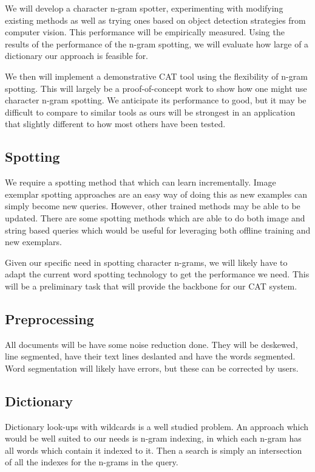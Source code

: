 \documentclass[ms]{byuprop}
\begin{document}
We will develop a character n-gram spotter, experimenting with modifying existing methods as well as trying ones based on object detection strategies from computer vision. This performance will be empirically measured. Using the results of the performance of the n-gram spotting, we will evaluate how large of a dictionary our approach is feasible for.

We then will implement a demonstrative CAT tool using the flexibility of n-gram spotting. This will largely be a proof-of-concept work to show how one might use character n-gram spotting. We anticipate its performance to good, but it may be difficult to compare to similar tools as ours will be strongest in an application that slightly different to how most others have been tested.


\subsection{Spotting}
We require a spotting method that which can learn incrementally. Image exemplar spotting approaches are an easy way of doing this as new examples can simply become new queries. However, other trained methods may be able to be updated. There are some spotting methods which are able to do both image and string based queries\cite{Almazan2014} which would be useful for leveraging both offline training and new exemplars.

Given our specific need in spotting character n-grams, we will likely have to adapt the current word spotting technology to get the performance we need. This will be a preliminary task that will provide the backbone for our CAT system.

\subsection{Preprocessing}
All documents will be have some noise reduction done. They will be deskewed, line segmented, have their text lines deslanted and have the words segmented. Word segmentation will likely have errors, but these can be corrected by users.

\subsection{Dictionary}
Dictionary look-ups with wildcards is a well studied problem. An approach which would be well suited to our needs is n-gram indexing, in which each n-gram has all words which contain it indexed to it. Then a search is simply an intersection of all the indexes for the n-grams in the query.
\end{document}
